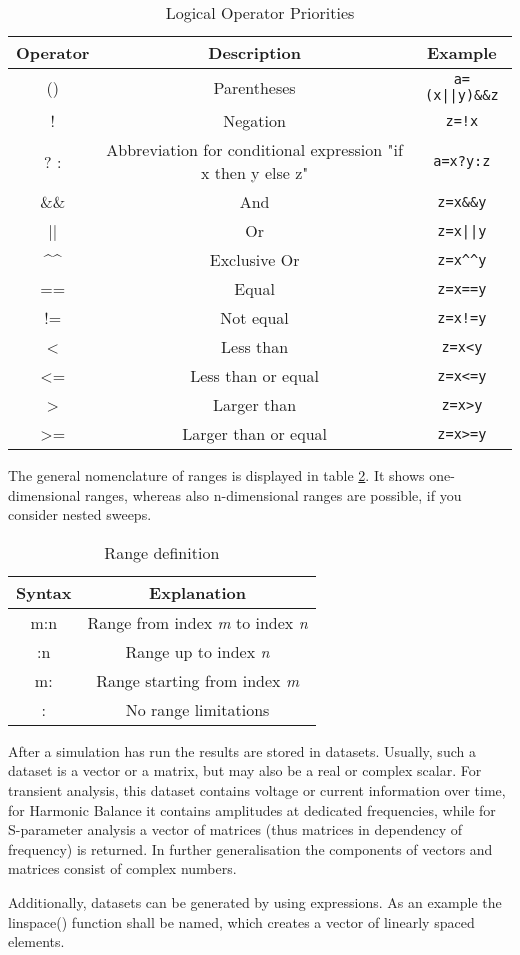 \begin{table}[ht]
\begin{center}\begin{tabular}{|c|c|c|}
\hline 
Operator&
Description&
Example\tabularnewline
\hline
\hline 
()&
Parentheses&
\texttt{a=(x||y)\&\&z}\tabularnewline
\hline
!&
Negation&
\texttt{z=!x}\tabularnewline
\hline 
? : &
Abbreviation for conditional expression "if x then y else z"&
\texttt{a=x?y:z}\tabularnewline
\hline 
\&\&&
And&
\texttt{z=x\&\&y}\tabularnewline
\hline 
{||}&
Or&
\texttt{z=x||y}\tabularnewline
\textasciicircum\textasciicircum&
Exclusive Or&
\texttt{z=x\textasciicircum\textasciicircum y}\tabularnewline
\hline 
==&
Equal&
\texttt{z=x==y}\tabularnewline
!=&
Not equal&
\texttt{z=x!=y}\tabularnewline
<&
Less than&
\texttt{z=x<y}\tabularnewline
<=&
Less than or equal&
\texttt{z=x<=y}\tabularnewline
>&
Larger than&
\texttt{z=x>y}\tabularnewline
>=&
Larger than or equal&
\texttt{z=x>=y}\tabularnewline

\hline 
\end{tabular}\end{center}


\caption{\label{table:logical-operators}Logical Operator Priorities}
\end{table}




The general nomenclature of ranges is displayed in table \ref{table:Range-definition}.
It shows one-dimensional ranges, whereas also n-dimensional ranges
are possible, if you consider nested sweeps.

%
\begin{table}
\begin{center}\begin{tabular}{|c|c|}
\hline 
Syntax&
Explanation\tabularnewline
\hline
\hline 
m:n&
Range from index \textit{m} to index \textit{n}\tabularnewline
\hline 
:n&
Range up to index \textit{n}\tabularnewline
\hline 
m:&
Range starting from index \textit{m}\tabularnewline
\hline 
:&
No range limitations\tabularnewline
\hline
\end{tabular}\end{center}


\caption{\label{table:Range-definition}Range definition}
\end{table}




After a simulation has run the results are stored in datasets. Usually,
such a dataset is a vector or a matrix, but may also be a real or
complex scalar. For transient analysis, this dataset contains voltage
or current information over time, for Harmonic Balance it contains
amplitudes at dedicated frequencies, while for S-parameter analysis
a vector of matrices (thus matrices in dependency of frequency) is
returned. In further generalisation the components of vectors and
matrices consist of complex numbers.

Additionally, datasets can be generated by using expressions. As an
example the linspace() function shall be named, which creates a vector
of linearly spaced elements.
